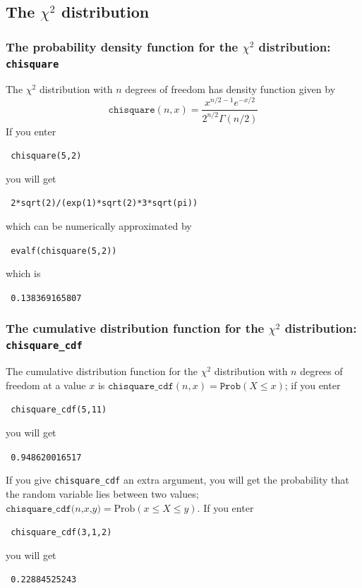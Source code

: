 \documentclass[a4paper,11pt]{book}
\begin{document}
\subsection{The $\chi^2$ distribution}

\subsubsection{The probability density function for the $\chi^2$
distribution: \texttt{chisquare}}

The $\chi^2$ distribution with
$n$ degrees of freedom has density function given by
\[
\texttt{chisquare}(n,x) =
\frac{x^{n/2-1}e^{-x/2}}{2^{n/2}\Gamma(n/2)}
\]
If you enter
\begin{center}
  \tt
  chisquare(5,2)
\end{center}
you will get
\begin{center}
  \tt
  2*sqrt(2)/(exp(1)*sqrt(2)*3*sqrt(pi))  
\end{center}
which can be numerically approximated by
\begin{center}
  \tt
  evalf(chisquare(5,2))
\end{center}
which is
\begin{center}
  \tt
  0.138369165807
\end{center}

\subsubsection{The cumulative distribution function for the $\chi^2$
distribution: \texttt{chisquare\_cdf}}

The cumulative distribution function for the $\chi^2$ distribution with
$n$ degrees of freedom at a value $x$ is
$\texttt{chisquare\_cdf}(n,x) = \texttt{Prob}(X \le x)$; if you
enter
\begin{center}
  \tt
  chisquare\_cdf(5,11)
\end{center}
you will get
\begin{center}
  \tt
  0.948620016517
\end{center}

If you give \texttt{chisquare\_cdf} an extra argument,
you will get the probability that
the random variable lies between two values;
$\texttt{chisquare\_cdf($n$,$x$,$y$)} = \text{Prob}(x \le X \le y)$.  If you
enter
\begin{center}
  \tt
  chisquare\_cdf(3,1,2)
\end{center}
you will get
\begin{center}
  \tt
  0.22884525243
\end{center}
\end{document}
